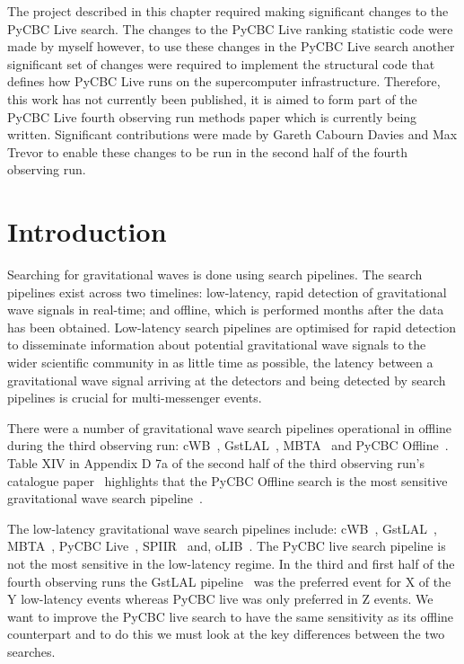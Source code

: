 The project described in this chapter required making significant changes to the PyCBC Live search. The changes to the PyCBC Live ranking statistic code were made by myself however, to use these changes in the PyCBC Live search another significant set of changes were required to implement the structural code that defines how PyCBC Live runs on the supercomputer infrastructure. Therefore, this work has not currently been published, it is aimed to form part of the PyCBC Live fourth observing run methods paper which is currently being written. Significant contributions were made by Gareth Cabourn Davies and Max Trevor to enable these changes to be run in the second half of the fourth observing run.

\section{\label{5:sec:introduction}Introduction}

Searching for gravitational waves is done using search pipelines. The search pipelines exist across two timelines: low-latency, rapid detection of gravitational wave signals in real-time; and offline, which is performed months after the data has been obtained. Low-latency search pipelines are optimised for rapid detection to disseminate information about potential gravitational wave signals to the wider scientific community in as little time as possible, the latency between a gravitational wave signal arriving at the detectors and being detected by search pipelines is crucial for multi-messenger events.

There were a number of gravitational wave search pipelines operational in offline during the third observing run: cWB~\cite{cWB:2020}, GstLAL~\cite{GstLAL:2020}, MBTA~\cite{MBTA:2021} and PyCBC Offline~\cite{PyCBC_global:2020}. Table XIV in Appendix D 7a of the second half of the third observing run's catalogue paper~\cite{gwtc3:2023} highlights that the PyCBC Offline search is the most sensitive gravitational wave search pipeline~\cite{PyCBC:2016, PyCBC:2017, PyCBC_package:2021}.

The low-latency gravitational wave search pipelines include: cWB~\cite{cWB:2020}, GstLAL~\cite{GstLAL:2020}, MBTA~\cite{MBTA:2021}, PyCBC Live~\cite{PyCBC_Live:2018}, SPIIR~\cite{SPIIR:2020} and, oLIB~\cite{oLIB:2015}. The PyCBC live search pipeline is not the most sensitive in the low-latency regime. In the third and first half of the fourth observing runs the GstLAL pipeline~\cite{GstLAL:2020} 
was the preferred event for X of the Y low-latency events whereas PyCBC live was only preferred in Z events. We want to improve the PyCBC live search to have the same sensitivity as its offline counterpart and to do this we must look at the key differences between the two searches.

